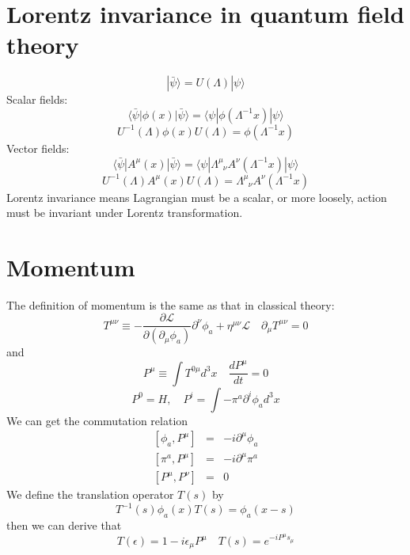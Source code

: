 \documentclass[cyan]{elegantnote}
\begin{document}
\section{Lorentz invariance in quantum field theory}
\[| \bar{\psi}\rangle = U(\Lambda)| \psi\rangle\]
Scalar fields:
\[\langle \bar{\psi} | \phi(x) | \bar{\psi}\rangle = \langle \psi | \phi(\Lambda^{-1}x) | \psi\rangle\]
\[U^{-1}(\Lambda) \phi(x) U(\Lambda) = \phi(\Lambda^{-1}x)\]
Vector fields:
\[\langle \bar{\psi} | A^{\mu}(x) | \bar{\psi}\rangle = \langle \psi | \Lambda^{\mu}_{\phantom{\mu}\nu} A^{\nu}(\Lambda^{-1}x) | \psi\rangle\]
\[U^{-1}(\Lambda) A^{\mu}(x) U(\Lambda) = \Lambda^{\mu}_{\phantom{\mu}\nu} A^{\nu}(\Lambda^{-1}x)\]
Lorentz invariance means Lagrangian must be a scalar, or more loosely, action must be invariant under Lorentz transformation.

\section{Momentum}
\noindent
The definition of momentum is the same as that in classical theory:
\[T^{\mu \nu} \equiv -\frac{\partial \mathcal{L}}{\partial(\partial_{\mu}\phi_a)} \partial^{\nu} \phi_a + \eta^{\mu \nu} \mathcal{L} \quad \partial_{\mu} T^{\mu \nu} = 0\]
and
\[P^{\mu} \equiv \int T^{0 \mu} d^3 x \quad \frac{d P^{\mu}}{dt} = 0\]
\[P^{0} = H, \quad P^{i} = \int -\pi^a \partial^i \phi_a d^3 x\]
We can get the commutation relation
\begin{eqnarray}
\left[\phi_a,P^{\mu}\right] &=& -i\partial^{\mu} \phi_a \nonumber \\
\left[\pi^a,P^{\mu}\right] &=& -i\partial^{\mu} \pi^a \nonumber \\
\left[P^{\mu},P^{\nu}\right] &=& 0 \nonumber 
\end{eqnarray}
We define the translation operator $T(s)$ by
\[T^{-1}(s) \phi_a(x) T(s) = \phi_a(x-s)\]
then we can derive that
\[T(\epsilon) = 1 - i\epsilon_{\mu} P^{\mu} \quad T(s) = e^{-iP^{\mu}s_{\mu}}\]
\end{document}
